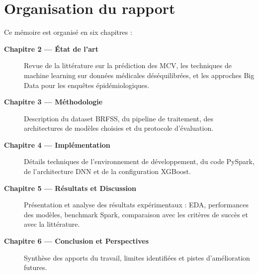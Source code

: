 \section{Organisation du rapport}

Ce mémoire est organisé en six chapitres :

\begin{description}
    \item[\textbf{Chapitre 2 — État de l'art}] Revue de la littérature sur la prédiction des MCV, les techniques de machine learning sur données médicales déséquilibrées, et les approches Big Data pour les enquêtes épidémiologiques.

    \item[\textbf{Chapitre 3 — Méthodologie}] Description du dataset BRFSS, du pipeline de traitement, des architectures de modèles choisies et du protocole d'évaluation.

    \item[\textbf{Chapitre 4 — Implémentation}] Détails techniques de l'environnement de développement, du code PySpark, de l'architecture DNN et de la configuration XGBoost.

    \item[\textbf{Chapitre 5 — Résultats et Discussion}] Présentation et analyse des résultats expérimentaux : EDA, performances des modèles, benchmark Spark, comparaison avec les critères de succès et avec la littérature.

    \item[\textbf{Chapitre 6 — Conclusion et Perspectives}] Synthèse des apports du travail, limites identifiées et pistes d'amélioration futures.
\end{description}
